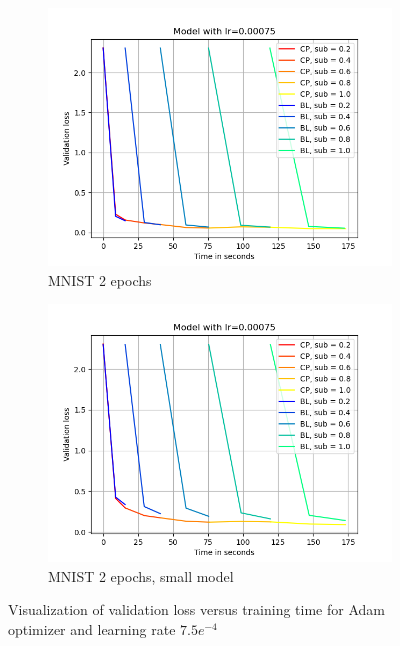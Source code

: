 \begin{figure}[h]
\begin{subfigure}[b]{0.24\textwidth}
        \centering
        \includegraphics[width=\textwidth]{figures/22_07/2ep/loss_time_0.00075.png}
        \caption{MNIST 2 epochs}
        \label{fig:13c}
    \end{subfigure}
    \begin{subfigure}[b]{0.24\textwidth}
        \centering
        \includegraphics[width=\textwidth]{figures/22_07/2ep_smaller/loss_time_0.00075.png}
        \caption{MNIST 2 epochs, small model}
        \label{fig:13d}
    \end{subfigure}
    \caption{Visualization of validation loss versus training time for Adam optimizer and learning rate $7.5e^{-4}$}
    \label{fig:three graphs}
\end{figure}

